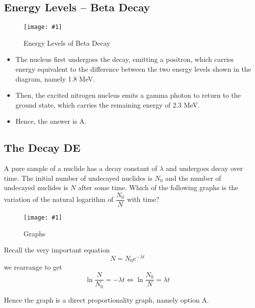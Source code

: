 \documentclass[a4paper,12pt]{article}
\newcommand{\img}[4]{\begin{center}
  \begin{figure}[H]
    \centering
    \texttt{[image: \#1]}
    \caption{#3}
    \label{fig:#4}
  \end{figure}
\end{center}}
\begin{document}
\pagebreak

\subsection{Energy Levels -- Beta Decay}

\img{ex/2.png}{0.7}{Energy Levels of Beta Decay}{ex2}

\begin{itemize}
  \item The nucleus first undergoes the decay, emitting a positron, which carries energy equivalent to the difference between the two energy levels shown in the diagram, namely 1.8 MeV.
  \item Then, the excited nitrogen nucleus emits a gamma photon to return to the ground state, which carries the remaining energy of 2.3 MeV.
  \item Hence, the answer is A.
\end{itemize}

\subsection{The Decay DE}

A pure sample of a nuclide has a decay constant of $\lambda$ and undergoes decay over time. The initial number of undecayed nuclides is $N_0$ and the number of undecayed nuclides is $N$ after some time. Which of the following graphs is the variation of the natural logarithm of $\dfrac{N_0}{N}$ with time?

\img{ex/3.png}{0.8}{Graphs}{ex3}

Recall the very important equation
$$N = N_0 e^{-\lambda t}$$
we rearrange to get
$$\ln \frac{N}{N_0} = -\lambda t \iff \ln \frac{N_0}{N} = \lambda t$$

Hence the graph is a direct proportionality graph, namely option A.
\end{document}
